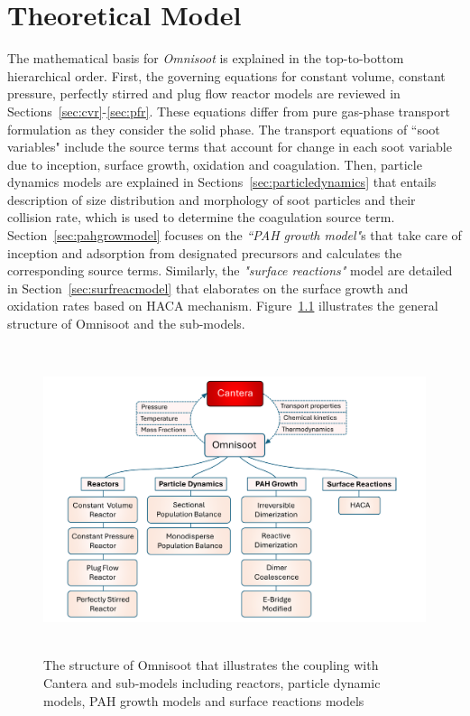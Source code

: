 \chapter{Theoretical Model}
The mathematical basis for \textit{Omnisoot} is explained in the top-to-bottom hierarchical order. First, the governing equations for constant volume, constant pressure, perfectly stirred and plug flow reactor models are reviewed in Sections~\ref{sec:cvr}-\ref{sec:pfr}. These equations differ from pure gas-phase transport formulation as they consider the solid phase. The transport equations of ``soot variables" include the source terms that account for change in each soot variable due to inception, surface growth, oxidation and coagulation. Then, particle dynamics models are explained in Sections~\ref{sec:particledynamics} that entails description of size distribution and morphology of soot particles and their collision rate, which is used to determine the coagulation source term. Section~\ref{sec:pahgrowmodel} focuses on the \textit{``PAH growth model"}s that take care of inception and adsorption from designated precursors and calculates the corresponding source terms. Similarly, the \textit{"surface reactions"} model are detailed in Section~\ref{sec:surfreacmodel} that elaborates on the surface growth and oxidation rates based on HACA mechanism. %
Figure~\ref{fig:structure} illustrates the general structure of Omnisoot and the sub-models.

\begin{figure}[!htbp]
	\centering
	\includegraphics[height=90mm, ]{Figures/Theory/structure.pdf}
	\caption{The structure of Omnisoot that illustrates the coupling with Cantera and sub-models including reactors, particle dynamic models, PAH growth models and surface reactions models}
	\label{fig:structure}
\end{figure}


